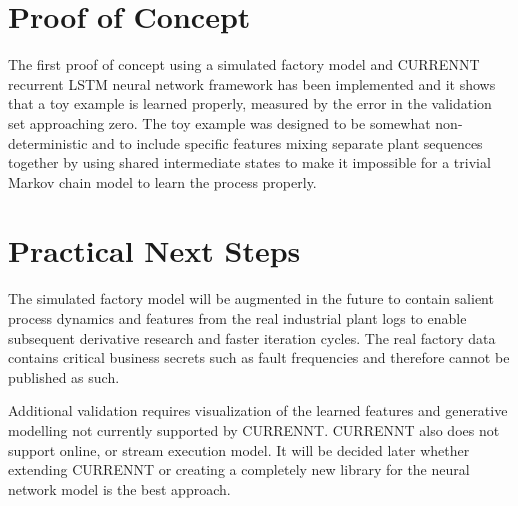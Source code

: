 \documentclass[a4paper,10pt]{article}
\begin{document}
\section{Proof of Concept}

The first proof of concept using a simulated factory model and CURRENNT\cite{CURRENNT} recurrent LSTM neural network framework
has been implemented and it shows that
a toy example\cite{PoC}
is learned properly, measured by the error in the validation set approaching zero. The toy example was designed to be somewhat non-deterministic and to include specific
features mixing separate plant sequences together by using shared intermediate states to make it impossible for a trivial Markov chain model to learn the process properly.

\section{Practical Next Steps}

The simulated factory model will be augmented in the future to contain salient process dynamics and features from the real industrial plant logs to enable subsequent
derivative research and faster iteration cycles. The real factory data contains critical business secrets such as fault frequencies and therefore cannot be published as such.

Additional validation requires visualization of the learned features and generative modelling not currently supported by CURRENNT.
CURRENNT also does not support online, or stream execution model. It will be decided later whether extending CURRENNT or creating a completely new library for
the neural network model is the best approach.
\end{document}
